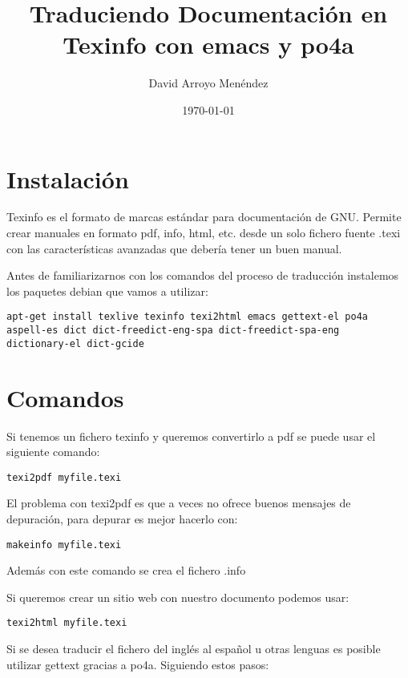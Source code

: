 \documentclass[11pt]{article}
\author{David Arroyo Menéndez}
\date{\today}
\title{Traduciendo Documentación en Texinfo con emacs y po4a}
\begin{document}
\maketitle
\tableofcontents


\section{Instalación}
\label{sec-1}

Texinfo es el formato de marcas estándar para documentación de
GNU. Permite crear manuales en formato pdf, info, html, etc. desde un
solo fichero fuente .texi con las características avanzadas que
debería tener un buen manual.

Antes de familiarizarnos con los comandos del proceso de traducción
instalemos los paquetes debian que vamos a utilizar:

\begin{verbatim}
apt-get install texlive texinfo texi2html emacs gettext-el po4a
aspell-es dict dict-freedict-eng-spa dict-freedict-spa-eng
dictionary-el dict-gcide
\end{verbatim}

\section{Comandos}
\label{sec-2}

Si tenemos un fichero texinfo y queremos convertirlo a pdf se puede usar el siguiente comando:

\begin{verbatim}
texi2pdf myfile.texi
\end{verbatim}

El problema con texi2pdf es que a veces no ofrece buenos mensajes de depuración, para depurar es mejor hacerlo con:

\begin{verbatim}
makeinfo myfile.texi
\end{verbatim}

Además con este comando se crea el fichero .info

Si queremos crear un sitio web con nuestro documento podemos usar:

\begin{verbatim}
texi2html myfile.texi
\end{verbatim}

Si se desea traducir el fichero del inglés al español u otras lenguas es posible utilizar gettext gracias a po4a. Siguiendo estos pasos:
\end{document}
